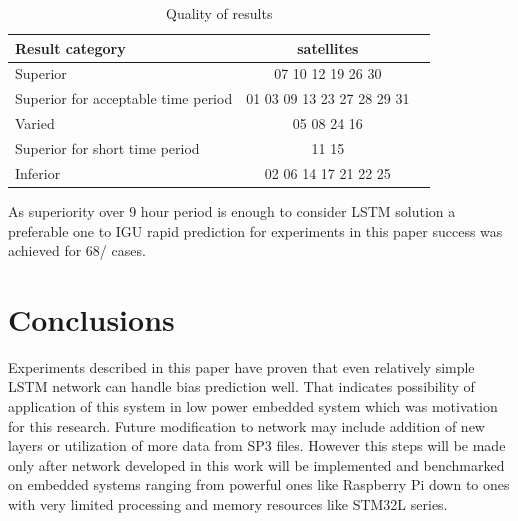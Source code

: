 \documentclass{kybernetika}
\begin{document}
\begin{table}[ht] \label{table:result}
\parindent0pt
\caption{Quality of results }
\centering
\begin{tabular}{ l  c  c }
  \hline
  \hline
  Result category & satellites\\  \hline
  Superior & 07 10 12 19 26 30\\  
  Superior for acceptable time period& 01 03 09 13 23 27 28 29 31\\ 
  Varied & 05 08 24 16\\ \hline \hline
  Superior for short time period& 11 15 \\ 
  Inferior & 02 06 14 17 21 22 25\\ 
 \end{tabular}
\end{table}

As superiority over 9 hour period is enough to consider LSTM solution a preferable one to
IGU rapid prediction for experiments in this paper success was achieved for 68/%
cases.

\FloatBarrier
\section{Conclusions}
Experiments described in this paper have proven that even relatively simple LSTM network can
handle bias prediction well. That indicates possibility of application of this system in 
low power embedded system which was motivation for this research. Future modification to network
may include addition of new layers or utilization of more data from SP3 files.
However this steps will be made only after network developed in this work will be implemented and
benchmarked on embedded systems ranging from powerful ones like Raspberry Pi down to ones
with very limited processing and memory resources like STM32L series.
\FloatBarrier
\makesubmdate
\end{document}
